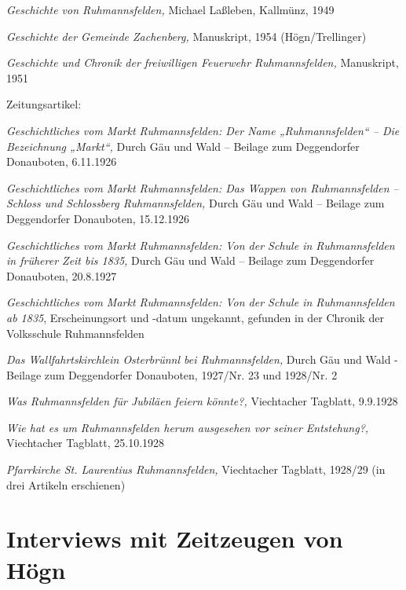 \documentclass{book}
\begin{document}
\textit{Geschichte von Ruhmannsfelden,} Michael Laßleben, Kallmünz, 1949


\textit{Geschichte der Gemeinde Zachenberg,} Manuskript, 1954
(Högn/Trellinger)

\textit{Geschichte und Chronik der freiwilligen Feuerwehr
Ruhmannsfelden,} Manuskript, 1951

Zeitungsartikel:

\textit{Geschichtliches vom Markt Ruhmannsfelden: Der Name
„Ruhmannsfelden“ – Die Bezeichnung „Markt“,} Durch Gäu und Wald –
Beilage zum Deggendorfer Donauboten, 6.11.1926

\textit{Geschichtliches vom Markt Ruhmannsfelden: Das Wappen von
Ruhmannsfelden – Schloss und Schlossberg Ruhmannsfelden,} Durch Gäu und
Wald – Beilage zum Deggendorfer Donauboten, 15.12.1926

\textit{Geschichtliches vom Markt Ruhmannsfelden: Von der Schule in
Ruhmannsfelden in früherer Zeit bis 1835,} Durch Gäu und Wald – Beilage
zum Deggendorfer Donauboten, 20.8.1927

\textit{Geschichtliches vom Markt Ruhmannsfelden: Von der Schule in
Ruhmannsfelden ab 1835}, Erscheinungsort und -datum ungekannt, gefunden
in der Chronik der Volksschule Ruhmannsfelden

\textit{Das Wallfahrtskirchlein Osterbrünnl bei Ruhmannsfelden,} Durch
Gäu und Wald - Beilage zum Deggendorfer Donauboten, 1927/Nr. 23 und
1928/Nr. 2

\textit{Was Ruhmannsfelden für Jubiläen feiern könnte?,} Viechtacher
Tagblatt, 9.9.1928

\textit{Wie hat es um Ruhmannsfelden herum ausgesehen vor seiner
Entstehung?,} Viechtacher Tagblatt, 25.10.1928

\textit{Pfarrkirche St. Laurentius Ruhmannsfelden,} Viechtacher
Tagblatt, 1928/29 (in drei Artikeln erschienen)

\section{Interviews mit Zeitzeugen von Högn}
\end{document}
